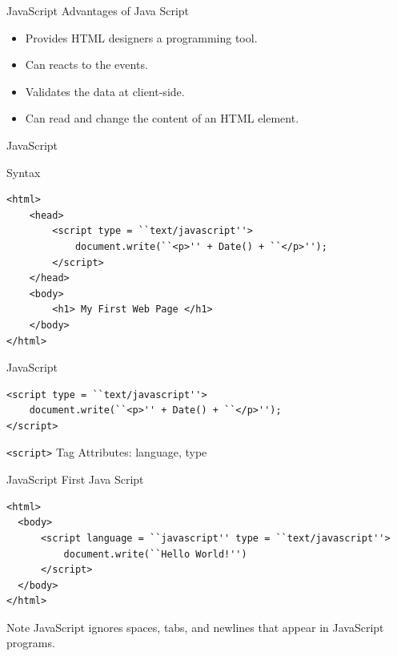 \documentclass[14pt]{beamer}
\begin{document}
\begin{frame}{JavaScript}
Advantages of Java Script
\begin{itemize}
 \item Provides HTML designers a programming tool.
 \item Can reacts to the events.
 \item Validates the data at client-side.
 \item Can read and change the content of an HTML element.
\end{itemize}
\end{frame}

\begin{frame}[fragile]{JavaScript}
\begin{block}{Syntax}
\begin{lstlisting}
<html>
    <head>
        <script type = ``text/javascript''>
            document.write(``<p>'' + Date() + ``</p>'');
        </script>
    </head>
    <body>
        <h1> My First Web Page </h1>
    </body>
</html> 
\end{lstlisting}
\end{block}
\end{frame}

\begin{frame}[fragile]{JavaScript}
\begin{lstlisting}
<script type = ``text/javascript''>
    document.write(``<p>'' + Date() + ``</p>'');
</script>
\end{lstlisting}
\lstinline!<script>! Tag Attributes: language, type
\end{frame}

\begin{frame}[fragile]{JavaScript}
First Java Script
\begin{block}{}
\begin{lstlisting}
<html>
  <body>
      <script language = ``javascript'' type = ``text/javascript''>
          document.write(``Hello World!'')
      </script>
  </body>
</html>
\end{lstlisting}
\end{block}
\begin{block}{Note}
JavaScript ignores spaces, tabs, and newlines that appear in JavaScript programs.
\end{block}
\end{frame}
\end{document}
